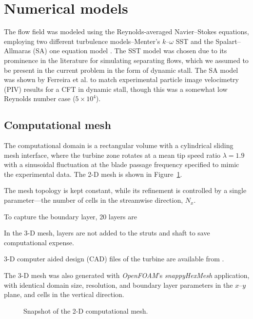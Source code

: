 \documentclass[aip,graphicx]{revtex4-1}
\begin{document}
\section{Numerical models}

The flow field was modeled using the Reynolds-averaged Navier--Stokes equations,
employing two different turbulence models--Menter's $k$--$\omega$ SST
\cite{Menter1994} and the Spalart--Allmaras (SA) one equation model
\cite{Spalart1992}. The SST model was chosen due to its prominence in the
literature for simulating separating flows, which we assumed to be present in
the current problem in the form of dynamic stall. The SA model was shown by
Ferreira et al. \cite{Ferreira2007} to match experimental particle image
velocimetry (PIV) results for a CFT in dynamic stall, though this was a somewhat
low Reynolds number case ($5 \times 10^4$).

\subsection{Computational mesh}

The computational domain is a rectangular volume
with a cylindrical sliding mesh interface, where the turbine zone rotates at a
mean tip speed ratio $\lambda=1.9$ with a sinusoidal fluctuation at the blade
passage frequency specified to mimic the experimental data. 
The 2-D mesh is
shown in Figure~\ref{fig:mesh}.

The mesh topology is kept constant, while its refinement is controlled by a
single parameter---the number of cells in the streamwise direction, $N_x$. 

To capture the boundary layer, 20 layers are

In the 3-D mesh, layers are not added to the struts and shaft to save
computational expense.

3-D computer aided design (CAD) files of the turbine are available from
\cite{Bachant2014-RVAT-CAD}.

The 3-D mesh was also generated with \textit{OpenFOAM}'s \textit{snappyHexMesh}
application, with identical domain size, resolution, and boundary layer
parameters in the $x$--$y$ plane, and 
cells in the vertical direction.

\begin{figure}[ht]
\caption{Snapshot of the 2-D computational mesh.}
\label{fig:mesh}
\end{figure}
\end{document}
